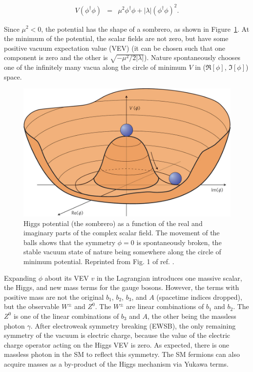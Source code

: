 \documentclass[dissertation.tex]{subfiles}
\begin{document}
\begin{eqnarray}
V(\phi^{\dagger}\phi) &=& \mu^{2}\phi^{\dagger}\phi + |\lambda|(\phi^{\dagger}\phi)^{2}.
\label{eq:Higgs_potential}
\end{eqnarray}

Since $\mu^{2} < 0$, the potential has the shape of a sombrero, as shown in Figure~\ref{fig:Higgs_potential}.  At the minimum of the potential, the scalar fields are not zero, but have some positive vacuum expectation value (VEV) (it can be chosen such that one component is zero and the other is $\sqrt{-\mu^{2}/2|\lambda|}$).  Nature spontaneously chooses one of the infinitely many vacua along the circle of minimum $V$ in ($\Re\left[\phi\right]$, $\Im\left[\phi\right]$) space.

\begin{figure}
	\centering
	\includegraphics[scale=0.3]{Higgs_potential}
	\caption{Higgs potential (the sombrero) as a function of the real and imaginary parts of the complex scalar field.  The movement of the balls shows that the symmetry $\phi = 0$ is spontaneously broken, the stable vacuum state of nature being somewhere along the circle of minimum potential.  Reprinted from Fig. 1 of ref. \cite{Alvarez-Gaume}.}
	\label{fig:Higgs_potential}
\end{figure}

Expanding $\phi$ about its VEV $v$ in the Lagrangian introduces one massive scalar, the Higgs, and new mass terms for the gauge bosons.  However, the terms with positive mass are not the original $b_{1}$, $b_{2}$, $b_{3}$, and $A$ (spacetime indices dropped), but the observable $W^{\pm}$ and $Z^{0}$.  The $W^{\pm}$ are linear combinations of $b_{1}$ and $b_{2}$.  The $Z^{0}$ is one of the linear combinations of $b_{3}$ and $A$, the other being the massless photon $\gamma$.  After electroweak symmetry breaking (EWSB), the only remaining symmetry of the vacuum is electric charge, because the value of the electric charge operator acting on the Higgs VEV is zero.  As expected, there is one massless photon in the SM to reflect this symmetry.  The SM fermions can also acquire masses as a by-product of the Higgs mechanism via Yukawa terms.
\end{document}
